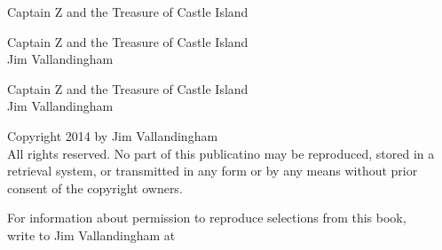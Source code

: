 \documentclass[12pt]{extbook}
\newcommand\blankpage{%
    \null
    \thispagestyle{empty}%
    \addtocounter{page}{-1}%
    \newpage}
\begin{document}



  \pagestyle{empty}
  \vspace*{\fill}
  \begin{center}
  \huge{Captain Z and the Treasure of Castle Island}\\[0.5cm]
  \end{center}
  \vspace*{\fill}

  \begin{titlepage}
    \vspace*{\fill}
    \begin{center}
      \huge{Captain Z and the Treasure of Castle Island}\\[0.5cm]
      \large {Jim Vallandingham}\\[0.4cm]
    \end{center}
    \vspace*{\fill}
  \end{titlepage}
  
  \begingroup
  \footnotesize
  \parindent 0pt
  \parskip \baselineskip
  \vfill
  Captain Z and the Treasure of Castle Island \\
  Jim Vallandingham \\

  \vfill

  Copyright \textcopyright{} 2014 by Jim Vallandingham \\
  
  All rights reserved. No part of this publicatino may be reproduced, stored in a retrieval system, or transmitted in any form or by any means without prior consent of the copyright owners.

  For information about permission to reproduce selections from this book,\\
  write to Jim Vallandingham at 
\end{document}
